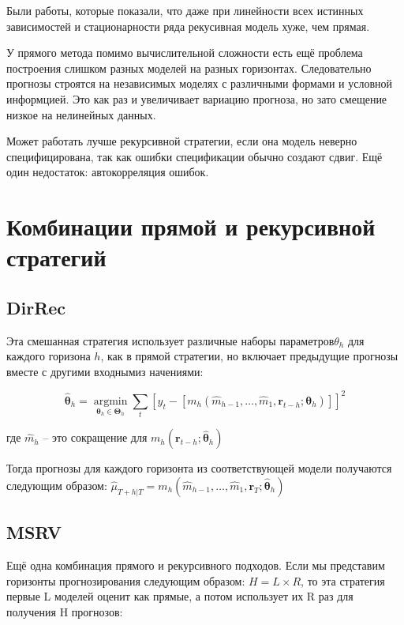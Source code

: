 \documentclass[a4paper,12pt]{article}
\begin{document}
Были работы, которые показали, что даже при линейности всех истинных зависимостей и стационарности ряда рекусивная модель хуже, чем прямая.

У прямого метода помимо вычислительной сложности есть ещё проблема построения слишком разных моделей на разных горизонтах. Следовательно прогнозы строятся на независимых моделях с различными формами и условной информцией. Это как раз и увеличивает вариацию прогноза, но зато смещение низкое на нелинейных данных.	

Может работать лучше рекурсивной стратегии, если она модель неверно специфицирована, так как ошибки спецификации обычно создают сдвиг. Ещё один недостаток: автокорреляция ошибок.

\section{Комбинации прямой и рекурсивной стратегий}

\subsection{DirRec}

Эта смешанная стратегия использует различные наборы параметров$ \theta_{h} $ для каждого горизона $ h $, как в прямой стратегии, но включает предыдущие прогнозы вместе с другими входнымиз начениями:

\[
\hat{\boldsymbol{\theta}}_{h}=\underset{\boldsymbol{\theta}_{h} \in \boldsymbol{\Theta}_{h}}{\operatorname{argmin}} \sum_{t}\left[y_{t}-\left[m_{h}\left(\hat{m}_{h-1}, \ldots, \hat{m}_{1}, \boldsymbol{r}_{t-h} ; \boldsymbol{\theta}_{h}\right)\right]\right]^{2}
\]

где $\hat{m}_{h}$ -- это сокращение для  $m_{h}\left(\boldsymbol{r}_{t-h} ; \hat{\boldsymbol{\theta}}_{h}\right)$ 

Тогда прогнозы для каждого горизонта из соответствующей модели получаются следующим образом: $\hat{\mu}_{T+h | T}=m_{h}\left(\hat{m}_{h-1}, \ldots, \hat{m}_{1}, \boldsymbol{r}_{T} ; \hat{\boldsymbol{\theta}}_{h}\right)$

\subsection{MSRV}

Ещё одна комбинация прямого и рекурсивного подходов. Если мы представим горизонты прогнозирования следующим образом: $H=L \times R$, то эта стратегия первые L моделей оценит как прямые, а потом использует их R раз для получения H прогнозов:
\end{document}

